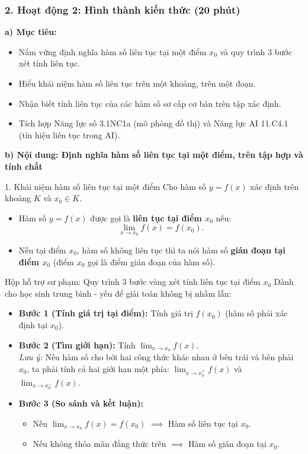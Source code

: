 \documentclass[12pt, a4paper]{article}
\begin{document}
\subsubsection*{2. Hoạt động 2: Hình thành kiến thức (20 phút)}

\noindent \textbf{a) Mục tiêu:}
\begin{itemize}[leftmargin=0.6cm]
    \item Nắm vững định nghĩa hàm số liên tục tại một điểm $x_0$ và quy trình 3 bước xét tính liên tục.
    \item Hiểu khái niệm hàm số liên tục trên một khoảng, trên một đoạn.
    \item Nhận biết tính liên tục của các hàm số sơ cấp cơ bản trên tập xác định.
    \item Tích hợp Năng lực số 3.1NC1a (mô phỏng đồ thị) và Năng lực AI 11.C4.1 (tín hiệu liên tục trong AI).
\end{itemize}

\noindent \textbf{b) Nội dung: Định nghĩa hàm số liên tục tại một điểm, trên tập hợp và tính chất}

\begin{pedabox}{1. Khái niệm hàm số liên tục tại một điểm}
Cho hàm số $y = f(x)$ xác định trên khoảng $K$ và $x_0 \in K$.
\begin{itemize}[leftmargin=0.6cm]
    \item Hàm số $y = f(x)$ được gọi là \textbf{liên tục tại điểm $x_0$} nếu:
    $$\lim_{x \to x_0} f(x) = f(x_0).$$
    \item Nếu tại điểm $x_0$, hàm số không liên tục thì ta nói hàm số \textbf{gián đoạn tại điểm $x_0$} (điểm $x_0$ gọi là điểm gián đoạn của hàm số).
\end{itemize}
\end{pedabox}

\begin{scaffoldbox}{Hộp hỗ trợ sư phạm: Quy trình 3 bước vàng xét tính liên tục tại điểm $x_0$}
Dành cho học sinh trung bình - yếu để giải toán không bị nhầm lẫn:
\begin{itemize}[leftmargin=0.6cm]
    \item \textbf{Bước 1 (Tính giá trị tại điểm):} Tính giá trị $f(x_0)$ (hàm số phải xác định tại $x_0$).
    \item \textbf{Bước 2 (Tìm giới hạn):} Tính $\lim_{x \to x_0} f(x)$.\\
    \textit{Lưu ý:} Nếu hàm số cho bởi hai công thức khác nhau ở bên trái và bên phải $x_0$, ta phải tính cả hai giới hạn một phía: $\lim_{x \to x_0^+} f(x)$ và $\lim_{x \to x_0^-} f(x)$.
    \item \textbf{Bước 3 (So sánh và kết luận):}
    \begin{itemize}
        \item Nếu $\lim_{x \to x_0} f(x) = f(x_0)$ $\implies$ Hàm số liên tục tại $x_0$.
        \item Nếu không thỏa mãn đẳng thức trên $\implies$ Hàm số gián đoạn tại $x_0$.
    \end{itemize}
\end{itemize}
\end{scaffoldbox}
\end{document}

